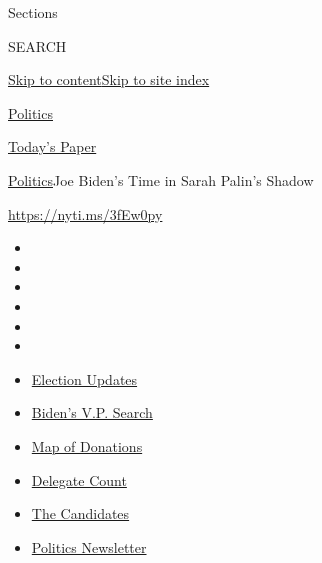 Sections

SEARCH

\protect\hyperlink{site-content}{Skip to
content}\protect\hyperlink{site-index}{Skip to site index}

\href{https://www.nytimes.com/section/politics}{Politics}

\href{https://myaccount.nytimes.com/auth/login?response_type=cookie\&client_id=vi}{}

\href{https://www.nytimes.com/section/todayspaper}{Today's Paper}

\href{/section/politics}{Politics}\textbar{}Joe Biden's Time in Sarah
Palin's Shadow

\url{https://nyti.ms/3fEw0py}

\begin{itemize}
\item
\item
\item
\item
\item
\item
\end{itemize}

\begin{itemize}
\item
  \href{https://www.nytimes.com/2020/07/31/us/elections/biden-vs-trump.html?action=click\&pgtype=Article\&state=default\&region=TOP_BANNER\&context=storylines_menu}{Election
  Updates}
\item
  \href{https://www.nytimes.com/article/biden-vice-president-2020.html?action=click\&pgtype=Article\&state=default\&region=TOP_BANNER\&context=storylines_menu}{Biden's
  V.P. Search}
\item
  \href{https://www.nytimes.com/interactive/2020/07/24/us/politics/trump-biden-campaign-donors.html?action=click\&pgtype=Article\&state=default\&region=TOP_BANNER\&context=storylines_menu}{Map
  of Donations}
\item
  \href{https://www.nytimes.com/interactive/2020/us/elections/delegate-count-primary-results.html?action=click\&pgtype=Article\&state=default\&region=TOP_BANNER\&context=storylines_menu}{Delegate
  Count}
\item
  \href{https://www.nytimes.com/interactive/2019/us/politics/2020-presidential-candidates.html?action=click\&pgtype=Article\&state=default\&region=TOP_BANNER\&context=storylines_menu}{The
  Candidates}
\item
  \href{https://www.nytimes.com/newsletters/politics?action=click\&pgtype=Article\&state=default\&region=TOP_BANNER\&context=storylines_menu}{Politics
  Newsletter}
\end{itemize}

